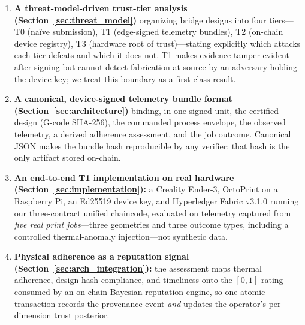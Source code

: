 \begin{enumerate}
  \item \textbf{A threat-model-driven trust-tier analysis
  (Section~\ref{sec:threat_model})} organizing bridge designs into four
  tiers---T0 (na\"ive submission), T1 (edge-signed telemetry bundles), T2
  (on-chain device registry), T3 (hardware root of trust)---stating
  explicitly which attacks each tier defeats and which it does not.  T1
  makes evidence tamper-evident after signing but cannot detect
  fabrication at source by an adversary holding the device key; we treat
  this boundary as a first-class result.

  \item \textbf{A canonical, device-signed telemetry bundle format
  (Section~\ref{sec:architecture})} binding, in one signed unit, the
  certified design (G-code SHA-256), the commanded process envelope, the
  observed telemetry, a derived adherence assessment, and the job
  outcome.  Canonical JSON makes the bundle hash reproducible by any
  verifier; that hash is the only artifact stored on-chain.

  \item \textbf{An end-to-end T1 implementation on real hardware
  (Section~\ref{sec:implementation}):} a Creality Ender-3, OctoPrint on a
  Raspberry Pi, an Ed25519 device key, and Hyperledger Fabric v3.1.0
  running our three-contract unified chaincode, evaluated on telemetry
  captured from \emph{five real print jobs}---three geometries and three
  outcome types, including a controlled thermal-anomaly injection---not
  synthetic data.

  \item \textbf{Physical adherence as a reputation signal
  (Section~\ref{sec:arch_integration}):} the assessment maps thermal
  adherence, design-hash compliance, and timeliness onto the $[0,1]$
  rating consumed by an on-chain Bayesian reputation engine, so one
  atomic transaction records the provenance event \emph{and} updates the
  operator's per-dimension trust posterior.
\end{enumerate}
